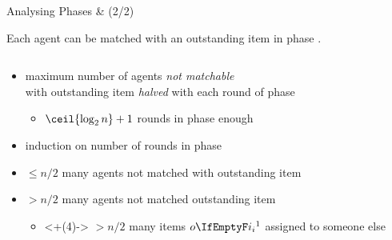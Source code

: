 \begin{frame}{Analysing Phases \phasei{} \& \phaseiii{} (2/2)}
	\adjustfortopblock
	\begin{lemma}
		Each agent can be matched with an outstanding item in phase \phaseiii.
	\end{lemma}
	\begin{columns}[T]
		\begin{column}{0.65\textwidth}
			\pause
			\begin{itemize}[<+->]
				\item
				maximum number of agents \emph{not matchable} \\ with outstanding item \emph{halved} with each round of phase \phasei
				\begin{itemize}[<+->]
					\item
					\(\ceil{\log_2 n} + 1\) rounds in phase \phasei{} enough
				\end{itemize}

				\item
				induction on number of rounds in phase \phasei
			\end{itemize}
			\begin{itemize}[<+->]
				\item
				\(\le n/2\) many agents not matched with outstanding item

				\item
				\(> n/2\) many agents not matched outstanding item
				\begin{itemize}
					\item<+(4)->
					\(> n/2\) many items \(\asgd*{1}\) assigned to someone else


\end{itemize}
\end{itemize}
\end{column}
\end{columns}
\end{frame}
